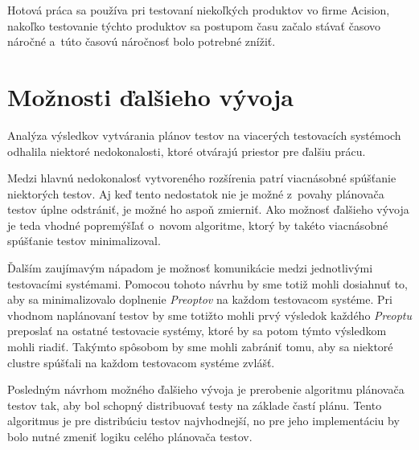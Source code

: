 Hotová práca sa používa pri testovaní niekoľkých produktov vo
firme Acision, nakoľko testovanie týchto produktov sa postupom času 
začalo stávať časovo náročné a~túto časovú náročnosť bolo potrebné znížiť.


\section{Možnosti ďalšieho vývoja}
\label{sekcia:moznosti_dalsieho_vyvoja}
Analýza výsledkov vytvárania plánov testov na viacerých testovacích systémoch
odhalila niektoré nedokonalosti, ktoré otvárajú priestor pre ďalšiu prácu. 

Medzi hlavnú nedokonalosť vytvoreného rozšírenia patrí viacnásobné spúšťanie
niektorých testov. Aj keď tento nedostatok nie je možné z~povahy 
plánovača testov úplne odstrániť, je možné ho aspoň zmierniť. 
Ako možnosť ďalšieho vývoja je teda vhodné popremýšľať o~novom algoritme, ktorý
by takéto viacnásobné spúšťanie testov minimalizoval.

Ďalším zaujímavým nápadom je možnosť komunikácie medzi jednotlivými 
testovacími systémami. Pomocou tohoto návrhu by sme totiž mohli dosiahnuť to,
aby sa minimalizovalo doplnenie \textit{Preoptov} na každom testovacom systéme. 
Pri vhodnom naplánovaní testov by sme totižto mohli prvý výsledok každého
\textit{Preoptu} preposlať na ostatné testovacie systémy, ktoré by sa potom týmto
výsledkom mohli riadiť. Takýmto spôsobom by sme mohli zabrániť tomu,
aby sa niektoré clustre spúšťali na každom testovacom systéme zvlášť.

Posledným návrhom možného ďalšieho vývoja je prerobenie algoritmu plánovača 
testov tak, aby bol schopný distribuovať testy na základe častí plánu.
Tento algoritmus je pre distribúciu testov najvhodnejší, no pre jeho implementáciu
by bolo nutné zmeniť logiku celého plánovača testov.

